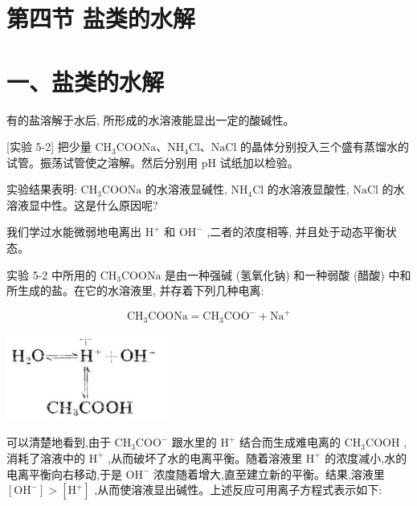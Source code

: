 \documentclass[10pt]{article}
\begin{document}
\section*{第四节 盐类的水解}

\section*{一、盐类的水解}

有的盐溶解于水后, 所形成的水溶液能显出一定的酸碱性。

[实验 5-2] 把少量 \({\mathrm{{CH}}}_{3}\mathrm{{COONa}}\text{、}{\mathrm{{NH}}}_{4}\mathrm{{Cl}}\text{、}\mathrm{{NaCl}}\) 的晶体分别投入三个盛有蒸馏水的试管。振荡试管使之溶解。然后分别用 \(\mathrm{{pH}}\) 试纸加以检验。

实验结果表明: \({\mathrm{{CH}}}_{3}\mathrm{{COONa}}\) 的水溶液显碱性, \({\mathrm{{NH}}}_{4}\mathrm{{Cl}}\) 的水溶液显酸性, \(\mathrm{{NaCl}}\) 的水溶液显中性。这是什么原因呢?

我们学过水能微弱地电离出 \({\mathrm{H}}^{ + }\) 和 \({\mathrm{{OH}}}^{ - }\) ,二者的浓度相等, 并且处于动态平衡状态。

实验 5-2 中所用的 \({\mathrm{{CH}}}_{3}\mathrm{{COONa}}\) 是由一种强碱 (氢氧化钠) 和一种弱酸 (醋酸) 中和所生成的盐。在它的水溶液里, 并存着下列几种电离:

\[
{\mathrm{{CH}}}_{3}\mathrm{{COONa}} = {\mathrm{{CH}}}_{3}{\mathrm{{COO}}}^{ - } + {\mathrm{{Na}}}^{ + }
\]

\begin{center}
\includegraphics[max width=0.4\textwidth]{images/01912d13-9986-7822-a012-3f3f7be99dcb_143_687988.jpg}
\end{center}

可以清楚地看到,由于 \({\mathrm{{CH}}}_{3}{\mathrm{{COO}}}^{ - }\) 跟水里的 \({\mathrm{H}}^{ + }\) 结合而生成难电离的 \({\mathrm{{CH}}}_{3}\mathrm{{COOH}}\) ,消耗了溶液中的 \({\mathrm{H}}^{ + }\) ,从而破坏了水的电离平衡。随着溶液里 \({\mathrm{H}}^{ + }\) 的浓度减小,水的电离平衡向右移动,于是 \({\mathrm{{OH}}}^{ - }\) 浓度随着增大,直至建立新的平衡。结果,溶液里 \(\left\lbrack {\mathrm{{OH}}}^{ - }\right\rbrack > \left\lbrack {\mathrm{H}}^{ + }\right\rbrack\) ,从而使溶液显出碱性。上述反应可用离子方程式表示如下:
\end{document}

